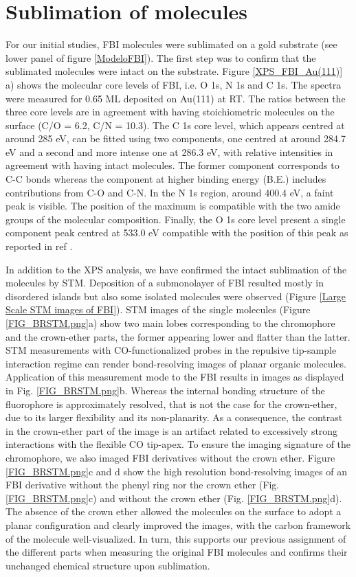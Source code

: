 \documentclass[aps,prl,reprint,longbibliography,superscriptaddress, english]{revtex4-1}
\begin{document}
\section{Sublimation of molecules}
For our initial studies, FBI molecules were sublimated on a gold substrate (see lower panel of figure \ref{ModeloFBI}). The first step was 
to confirm that the sublimated molecules were intact on the substrate. Figure \ref{XPS_FBI_Au(111)} a) shows the molecular core levels of FBI, i.e. O 1s, N 1s and C 1s. The spectra were measured for 0.65 ML deposited on Au(111) at RT. The ratios between the three core levels are in agreement with having stoichiometric molecules on the surface (C/O = 6.2, C/N = 10.3). The C 1s core level, which appears centred at around 285 eV, can be fitted using two components, one centred at around 284.7 eV and a second and more intense one at 286.3 eV, with relative intensities in agreement with having intact molecules. The former component corresponds to C-C bonds whereas the component at higher binding energy (B.E.) includes contributions from C-O and C-N. In the N 1s region, around 400.4 eV, a faint peak is visible. The position of the maximum is compatible with the two amide groups of the molecular composition. Finally, the O 1s core level present a single component peak centred at 533.0 eV compatible with the position of this peak as reported in ref \cite{stredansky_-surface_2019}. 

In addition to the XPS analysis, we have confirmed the intact sublimation of the molecules by STM. Deposition of a submonolayer of FBI resulted mostly in disordered islands but also some isolated molecules were observed (Figure \ref{Large Scale STM images of FBI}). STM images of the single molecules (Figure  \ref{FIG_BRSTM.png}a) show two main lobes corresponding to the chromophore and the crown-ether parts, the former appearing lower and flatter than the latter. STM measurements with CO-functionalized probes in the repulsive tip-sample interaction regime can render bond-resolving images of planar organic molecules.\cite{gross_recent_2011,gross_atomic_2018} Application of this measurement mode to the FBI results in images as displayed in Fig. \ref{FIG_BRSTM.png}b.  Whereas the internal bonding structure of the fluorophore is approximately resolved, that is not the case for the crown-ether, due to its larger flexibility and its non-planarity. As a consequence, the contrast in the crown-ether part of the image is an artifact related to excessively strong interactions with the flexible CO tip-apex.\cite{moll_mechanisms_2010,hapala_mechanism_2014} To ensure the imaging signature of the chromophore, we also imaged FBI derivatives without the crown ether. Figure  \ref{FIG_BRSTM.png}c and d show the high resolution bond-resolving images of an FBI derivative without the phenyl ring nor the crown ether (Fig. \ref{FIG_BRSTM.png}c)  and without the crown ether (Fig. \ref{FIG_BRSTM.png}d). The absence of the crown ether allowed the molecules on the surface to adopt a planar configuration and clearly improved the images, with the carbon framework of the molecule well-visualized. In turn, this supports our previous assignment of the different parts when measuring the original FBI molecules and confirms their unchanged chemical structure upon sublimation.  
\end{document}

